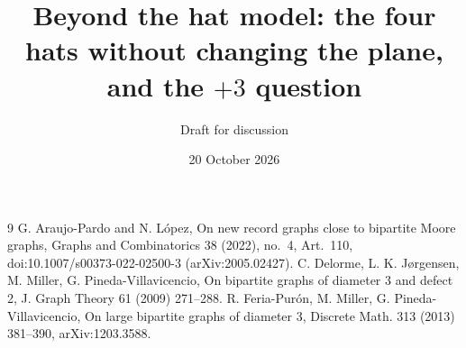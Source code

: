 \documentclass[11pt]{article}
\title{Beyond the hat model: the four hats without changing the plane, and the $+3$ question}
\author{Draft for discussion}
\date{20 October 2026}
\theoremstyle{remark}\newtheorem{remark}[theorem]{Remark}
\theoremstyle{definition}\newtheorem{definition}[theorem]{Definition}
\begin{document}
\maketitle


\begin{thebibliography}{9}
 G. Araujo-Pardo and N. L\'opez, On new record graphs close to bipartite Moore graphs, Graphs and Combinatorics 38 (2022), no.~4, Art.~110, doi:10.1007/s00373-022-02500-3 (arXiv:2005.02427).
 C. Delorme, L. K. J{\o}rgensen, M. Miller, G. Pineda-Villavicencio, On bipartite graphs of diameter 3 and defect 2, J. Graph Theory 61 (2009) 271--288.
 R. Feria-Pur\'on, M. Miller, G. Pineda-Villavicencio, On large bipartite graphs of diameter 3, Discrete Math. 313 (2013) 381--390, arXiv:1203.3588.
\end{thebibliography}
\end{document}
